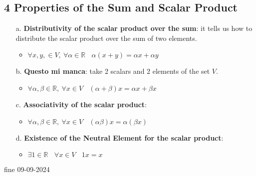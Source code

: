     \subsection{4 Properties of the Sum and Scalar Product}

    \begin{enumerate}
        \item[a.] \textbf{Distributivity of the scalar product over the sum}: it tells us how to distribute the scalar product over the sum of two elements.
            \begin{itemize}
                \item $\forall x,y, \in V, \ \forall \alpha \in \mathbb{R} \ \ \ \  \alpha (x+y) = \alpha x + \alpha y $
            \end{itemize}
        \item[b.] \textbf{Questo mi manca}: take 2 scalars and 2 elements of the set $V$.
            \begin{itemize}
                \item $ \forall \alpha , \beta \in \mathbb{R}, \ \forall x \in V \ \ \ \ (\alpha + \beta) x = \alpha x + \beta x $
            \end{itemize}
        \item[c.] \textbf{Associativity of the scalar product}:
            \begin{itemize}
                \item $\forall \alpha, \beta \in \mathbb{R}, \ \forall x \in V \ \ \ \ (\alpha \beta) x = \alpha (\beta x) $
            \end{itemize}
        \item[d.] \textbf{Existence of the Neutral Element for the scalar product}:
            \begin{itemize}
                \item $\exists 1 \in \mathbb{R} \ \ \ \ \forall x \in V \ \ \ \ 1x = x$
            \end{itemize}
    \end{enumerate}
        



    
    fine 09-09-2024